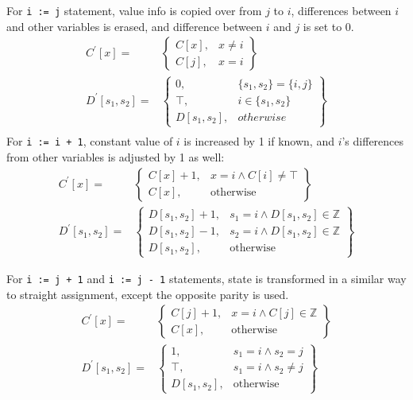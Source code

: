 For \texttt{i := j} statement, value info is copied over from $j$ to $i$, differences between $i$ and other variables is erased, and difference between $i$ and $j$ is set to 0.
\begin{align*}
C^\prime[x] = & \left.
	\begin{cases}
		C[x], & x\ne i \\
		C[j], & x = i
	\end{cases}
\right\}\\
D^\prime[s_1,s_2] = & \left.
	\begin{cases}
		0, & \{s_1,s_2\} = \{i,j\} \\
		\top, & i \in \{s_1, s_2\} \\
		D[s_1,s_2], & otherwise
	\end{cases}
\right\}\\
\end{align*}
For \texttt{i := i + 1}, constant value of $i$ is increased by 1 if known, and $i$'s differences from other variables is adjusted by 1 as well:
\begin{align*}
C^\prime[x] = & \left.
	\begin{cases}
		C[x] + 1, & x = i \wedge C[i] \ne \top \\
		C[x], & \text{otherwise}
	\end{cases}
\right\}\\
D^\prime[s_1,s_2] = & \left.
	\begin{cases}
		D[s_1,s_2] + 1, & s_1 = i \wedge D[s_1,s_2] \in \mathbb{Z}\\
		D[s_1,s_2] - 1, & s_2 = i \wedge D[s_1,s_2] \in \mathbb{Z}\\
		D[s_1,s_2], & \text{otherwise}
	\end{cases}
\right\}
\end{align*}

For \texttt{i := j + 1} and \texttt{i := j - 1} statements, state is transformed in a similar way to straight assignment, except the opposite parity is used.
\begin{align*}
C^\prime[x] = & \left.
	\begin{cases}
		C[j] + 1, & x = i \wedge C[j] \in \mathbb{Z} \\
		C[x], & \text{otherwise}
	\end{cases}
\right\}\\
D^\prime[s_1,s_2] = & \left.
	\begin{cases}
		1, & s_1 = i \wedge s_2 = j\\
		\top, & s_1 = i \wedge s_2 \ne j\\
		D[s_1,s_2], & \text{otherwise}	
	\end{cases}
\right\}\\
\end{align*}

